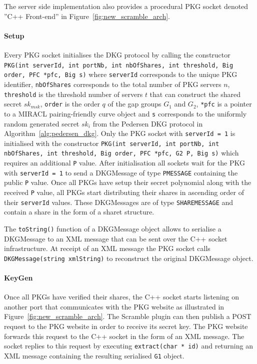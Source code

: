 The server side implementation also provides a procedural PKG socket denoted ''C++ Front-end'' in Figure~\ref{fig:new_scramble_arch}.

\paragraph{Setup} Every PKG socket initialises the DKG protocol by calling the constructor \texttt{PKG(int serverId, int portNb, int nbOfShares, int threshold, Big order, PFC *pfc, Big s)} where \texttt{serverId} corresponds to the unique PKG identifier, \texttt{nbOfShares} corresponds to the total number of PKG servers $n$, \texttt{threshold} is the threshold number of servers $t$ that can construct the shared secret $sk_{msk}$, \texttt{order} is the order $q$ of the gap groups $G_1$ and $G_2$, \texttt{*pfc} is a pointer to a MIRACL pairing-friendly curve object and \texttt{s} corresponds to the uniformly random generated secret $sk_i$ from the Pedersen DKG protocol in Algorithm~\ref{alg:pedersen_dkg}. Only the PKG socket with \texttt{serverId = 1} is initialised with the constructor \texttt{PKG(int serverId, int portNb, int nbOfShares, int threshold, Big order, PFC *pfc, G2 P, Big s)} which requires an additional \texttt{P} value. After initialisation all sockets wait for the PKG with \texttt{serverId = 1} to send a DKGMessage of type \texttt{P\textunderscore MESSAGE} containing the public \texttt{P} value. Once all PKGs have setup their secret polynomial along with the received \texttt{P} value, all PKGs start distributing their shares in ascending order of their \texttt{serverId} values. These DKGMessages are of type \texttt{SHARE\textunderscore MESSAGE} and contain a share in the form of a share\textunderscore t structure.

The \texttt{toString()} function of a DKGMessage object allows to serialise a DKGMessage to an XML message that can be sent over the C++ socket infrastructure. At receipt of an XML message the PKG socket calls \texttt{DKGMessage(string xmlString)} to reconstruct the original DKGMessage object.

\paragraph{KeyGen} Once all PKGs have verified their shares, the C++ socket starts listening on another port that communicates with the PKG website as illustrated in Figure~\ref{fig:new_scramble_arch}. The Scramble plugin can then publish a POST request to the PKG website in order to receive its secret key. The PKG website forwards this request to the C++ socket in the form of an XML message. The socket replies to this request by executing \texttt{extract(char * id)} and returning an XML message containing the resulting serialised \texttt{G1} object.


